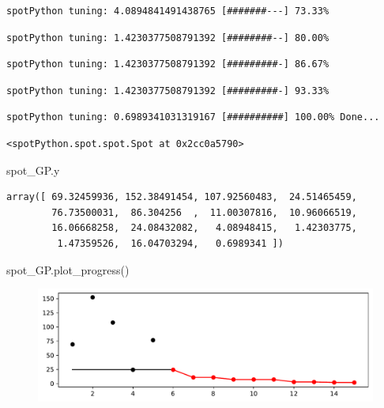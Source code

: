 \documentclass[
  letterpaper,
  DIV=11,
  numbers=noendperiod]{scrreprt}
\newenvironment{Shaded}{\begin{snugshade}}{\end{snugshade}}
\newcommand{\NormalTok}[1]{\textcolor[rgb]{0.00,0.23,0.31}{#1}}
\begin{document}
\begin{verbatim}
spotPython tuning: 4.0894841491438765 [#######---] 73.33% 
\end{verbatim}

\begin{verbatim}
spotPython tuning: 1.4230377508791392 [########--] 80.00% 
\end{verbatim}

\begin{verbatim}
spotPython tuning: 1.4230377508791392 [#########-] 86.67% 
\end{verbatim}

\begin{verbatim}
spotPython tuning: 1.4230377508791392 [#########-] 93.33% 
\end{verbatim}

\begin{verbatim}
spotPython tuning: 0.6989341031319167 [##########] 100.00% Done...
\end{verbatim}

\begin{verbatim}
<spotPython.spot.spot.Spot at 0x2cc0a5790>
\end{verbatim}

\begin{Shaded}
\begin{Highlighting}[]
\NormalTok{spot\_GP.y}
\end{Highlighting}
\end{Shaded}

\begin{verbatim}
array([ 69.32459936, 152.38491454, 107.92560483,  24.51465459,
        76.73500031,  86.304256  ,  11.00307816,  10.96066519,
        16.06668258,  24.08432082,   4.08948415,   1.42303775,
         1.47359526,  16.04703294,   0.6989341 ])
\end{verbatim}

\begin{Shaded}
\begin{Highlighting}[]
\NormalTok{spot\_GP.plot\_progress()}
\end{Highlighting}
\end{Shaded}

\begin{figure}[H]

{\centering \includegraphics{012_num_spot_ei_files/figure-pdf/cell-35-output-1.pdf}

}

\end{figure}
\end{document}
